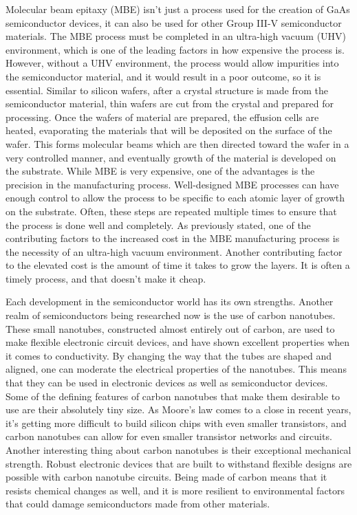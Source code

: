 \documentclass[12pt]{article}
\begin{document}
\begin{flushleft}
Molecular beam epitaxy (MBE) isn't just a process used
for the creation of GaAs semiconductor devices, it
can also be used for other Group III-V semiconductor
materials. The MBE process must be completed in an
ultra-high vacuum (UHV) environment, which is one of
the leading factors in how expensive the process is.
However, without a UHV environment, the process would
allow impurities into the semiconductor material, and
it would result in a poor outcome, so it is essential.
Similar to silicon wafers, after a crystal structure
is made from the semiconductor material, thin wafers
are cut from the crystal and prepared for processing.
Once the wafers of material are prepared, the effusion
cells are heated, evaporating the materials that will
be deposited on the surface of the wafer. This forms
molecular beams which are then directed toward the
wafer in a very controlled manner, and eventually growth
of the material is developed on the substrate. While
MBE is very expensive, one of the advantages is the
precision in the manufacturing process. Well-designed
MBE processes can have enough control to allow the
process to be specific to each atomic layer of growth
on the substrate. Often, these steps are repeated multiple
times to ensure that the process is done well and completely.
As previously stated, one of the contributing factors
to the increased cost in the MBE manufacturing process
is the necessity of an ultra-high vacuum environment.
Another contributing factor to the elevated cost is
the amount of time it takes to grow the layers. It
is often a timely process, and that doesn't make it
cheap.

Each development in the semiconductor world has its
own strengths. Another realm of semiconductors being
researched now is the use of carbon nanotubes. These
small nanotubes, constructed almost entirely out of
carbon, are used to make flexible electronic circuit
devices, and have shown excellent properties when it
comes to conductivity. By changing the way that the
tubes are shaped and aligned, one can moderate the
electrical properties of the nanotubes. This means
that they can be used in electronic devices as well
as semiconductor devices. Some of the defining features
of carbon nanotubes that make them desirable to use
are their absolutely tiny size. As Moore's law comes
to a close in recent years, it's getting more difficult
to build silicon chips with even smaller transistors,
and carbon nanotubes can allow for even smaller transistor
networks and circuits. Another interesting thing about
carbon nanotubes is their exceptional mechanical strength.
Robust electronic devices that are built to withstand
flexible designs are possible with carbon nanotube
circuits. Being made of carbon means that it resists chemical
changes as well, and it is more resilient to environmental
factors that could damage semiconductors made from other 
materials.


\end{flushleft}
\end{document}

